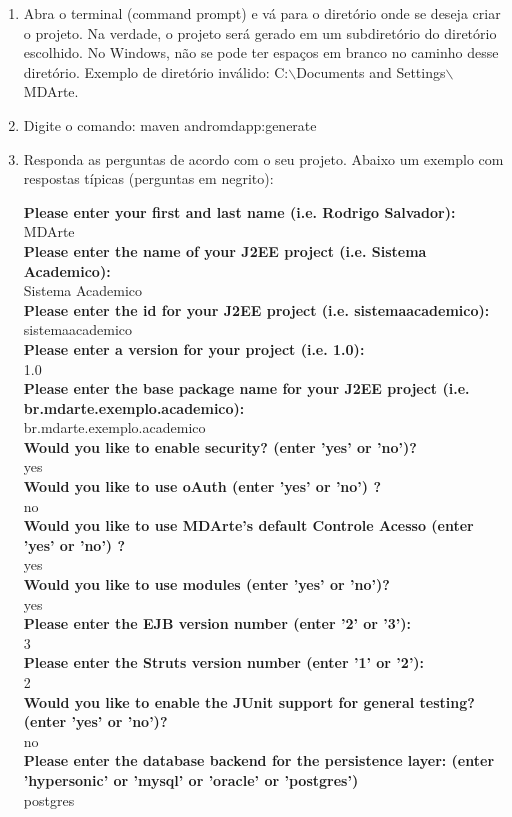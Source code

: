 \begin{enumerate}
\item Abra o terminal (command prompt) e vá para o diretório onde se deseja
criar o projeto. Na verdade, o projeto será gerado em um subdiretório do diretório escolhido. No Windows, não
se pode ter espaços em branco no caminho desse diretório. Exemplo de diretório inválido:
C:$\backslash$Documents and Settings$\backslash$MDArte.

\item Digite o comando: maven andromdapp:generate

\item Responda as perguntas de acordo com o seu projeto. Abaixo um exemplo com
respostas típicas (perguntas em negrito):

\textbf{Please enter your first and last name (i.e. Rodrigo Salvador):} \\
MDArte\\
\textbf{Please enter the name of your J2EE project (i.e. Sistema Academico):}\\
Sistema Academico\\
\textbf{Please enter the id for your J2EE project (i.e. sistemaacademico):}\\
sistemaacademico\\
\textbf{Please enter a version for your project (i.e. 1.0):}\\
1.0\\
\textbf{Please enter the base package name for your J2EE project (i.e.
br.mdarte.exemplo.academico):}\\
br.mdarte.exemplo.academico\\
\textbf{Would you like to enable security? (enter 'yes' or 'no')?}\\
yes\\
\textbf{Would you like to use oAuth (enter 'yes' or 'no') ?}\\
no\\
\textbf{Would you like to use MDArte's default Controle Acesso (enter 'yes' or
'no') ?}\\
yes\\
\textbf{Would you like to use modules (enter 'yes' or 'no')?}\\
yes\\
\textbf{Please enter the EJB version number (enter '2' or '3'):}\\
3\\
\textbf{Please enter the Struts version number (enter '1' or '2'):}\\
2\\
\textbf{Would you like to enable the JUnit support for general testing? (enter
'yes' or 'no')? }\\
 no\\
\textbf{Please enter the database backend for the persistence layer: (enter
'hypersonic' or 'mysql' or 'oracle' or 'postgres')}\\
 postgres\\
 

\end{enumerate}
